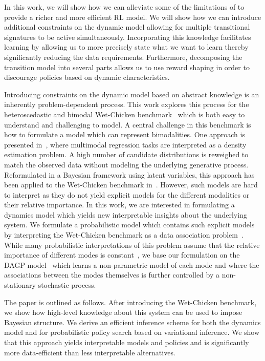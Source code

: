 In this work, we will show how we can alleviate some of the limitations of \parencite{deisenroth_pilco_2011} to provide a richer and more efficient RL model.
We will show how we can introduce additional constraints on the dynamic model allowing for multiple transitional signatures to be active simultaneously.
Incorporating this knowledge facilitates learning by allowing us to more precisely state what we want to learn thereby significantly reducing the data requirements.
Furthermore, decomposing the transition model into several parts allows us to use reward shaping \parencite{sutton_reinforcement_2018} in order to discourage policies based on dynamic characteristics.

Introducing constraints on the dynamic model based on abstract knowledge is an inherently problem-dependent process.
This work explores this process for the heteroscedastic and bimodal Wet-Chicken benchmark~\parencite{tresp_wet_1994,hans_efficient_2009} which is both easy to understand and challenging to model.
A central challenge in this benchmark is how to formulate a model which can represent bimodalities.
One approach is presented in~\parencite{bishop_mixture_1994}, where multimodal regression tasks are interpreted as a density estimation problem.
A high number of candidate distributions is reweighed to match the observed data without modeling the underlying generative process.
Reformulated in a Bayesian framework using latent variables, this approach has been applied to the Wet-Chicken benchmark in~\parencite{depeweg_learning_2016,depeweg_decomposition_2018}.
However, such models are hard to interpret as they do not yield explicit models for the different modalities or their relative importance.
In this work, we are interested in formulating a dynamics model which yields new interpretable insights about the underlying system.
We formulate a probabilistic model which contains such explicit models by interpreting the Wet-Chicken benchmark as a data association problem~\parencite{barshalom_tracking_1990,cox_review_1993}.
While many probabilistic interpretations of this problem assume that the relative importance of different modes is constant~\parencite{lazaro-gredilla_overlapping_2012,bodin_latent_2017}, we base our formulation on the DAGP model~\parencite{kaiser_data_2018} which learns a non-parametric model of each mode and where the associations between the modes themselves is further controlled by a non-stationary stochastic process.

The paper is outlined as follows.
After introducing the Wet-Chicken benchmark, we show how high-level knowledge about this system can be used to impose Bayesian structure.
We derive an efficient inference scheme for both the dynamics model and for probabilistic policy search based on variational inference.
We show that this approach yields interpretable models and policies and is significantly more data-efficient than less interpretable alternatives.


